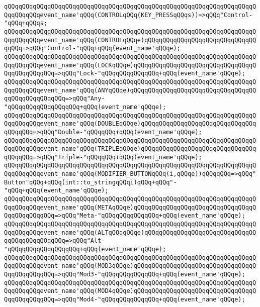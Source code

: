 \verb|qQQqqQQqqQQqqQQqqQQqqQQqqQQqqQQqqQQqqQQqqQQqqQQqqQQqqQQqqQQqqQQqqQQqqQQqqQQqqQQqevent_name'qQQq(CONTROLqQQq(KEY_PRESSqQQqs))=>qQQq"Control-"qQQq+qQQqs;|\newline
\verb|qQQqqQQqqQQqqQQqqQQqqQQqqQQqqQQqqQQqqQQqqQQqqQQqqQQqqQQqqQQqqQQqqQQqqQQqqQQqqQQqevent_name'qQQq(CONTROLqQQqe)qQQqqQQqqQQqqQQqqQQqqQQqqQQqqQQqqQQq=>qQQq"Control-"qQQq+qQQq(event_name'qQQqe);|\newline
\verb|qQQqqQQqqQQqqQQqqQQqqQQqqQQqqQQqqQQqqQQqqQQqqQQqqQQqqQQqqQQqqQQqqQQqqQQqqQQqqQQqevent_name'qQQq(LOCKqQQqe)qQQqqQQqqQQqqQQqqQQqqQQqqQQqqQQqqQQqqQQqqQQqqQQq=>qQQq"Lock-"qQQqqQQqqQQqqQQq+qQQq(event_name'qQQqe);|\newline
\verb|qQQqqQQqqQQqqQQqqQQqqQQqqQQqqQQqqQQqqQQqqQQqqQQqqQQqqQQqqQQqqQQqqQQqqQQqqQQqqQQqevent_name'qQQq(ANYqQQqe)qQQqqQQqqQQqqQQqqQQqqQQqqQQqqQQqqQQqqQQqqQQqqQQqqQQq=>qQQq"Any-"qQQqqQQqqQQqqQQqqQQq+qQQq(event_name'qQQqe);|\newline
\verb|qQQqqQQqqQQqqQQqqQQqqQQqqQQqqQQqqQQqqQQqqQQqqQQqqQQqqQQqqQQqqQQqqQQqqQQqqQQqqQQqevent_name'qQQq(DOUBLEqQQqe)qQQqqQQqqQQqqQQqqQQqqQQqqQQqqQQqqQQqqQQq=>qQQq"Double-"qQQqqQQq+qQQq(event_name'qQQqe);|\newline
\verb|qQQqqQQqqQQqqQQqqQQqqQQqqQQqqQQqqQQqqQQqqQQqqQQqqQQqqQQqqQQqqQQqqQQqqQQqqQQqqQQqevent_name'qQQq(TRIPLEqQQqe)qQQqqQQqqQQqqQQqqQQqqQQqqQQqqQQqqQQqqQQq=>qQQq"Triple-"qQQqqQQq+qQQq(event_name'qQQqe);|\newline
\verb|qQQqqQQqqQQqqQQqqQQqqQQqqQQqqQQqqQQqqQQqqQQqqQQqqQQqqQQqqQQqqQQqqQQqqQQqqQQqqQQqevent_name'qQQq(MODIFIER_BUTTONqQQq(i,qQQqe))qQQqqQQq=>qQQq"Button"qQQq+qQQq(int::to_stringqQQqi)qQQq+qQQq"-"qQQq+qQQq(event_name'qQQqe);|\newline
\verb|qQQqqQQqqQQqqQQqqQQqqQQqqQQqqQQqqQQqqQQqqQQqqQQqqQQqqQQqqQQqqQQqqQQqqQQqqQQqqQQqevent_name'qQQq(METAqQQqe)qQQqqQQqqQQqqQQqqQQqqQQqqQQqqQQqqQQqqQQqqQQqqQQq=>qQQq"Meta-"qQQqqQQqqQQqqQQq+qQQq(event_name'qQQqe);|\newline
\verb|qQQqqQQqqQQqqQQqqQQqqQQqqQQqqQQqqQQqqQQqqQQqqQQqqQQqqQQqqQQqqQQqqQQqqQQqqQQqqQQqevent_name'qQQq(ALTqQQqqQQqe)qQQqqQQqqQQqqQQqqQQqqQQqqQQqqQQqqQQqqQQqqQQqqQQq=>qQQq"Alt-"qQQqqQQqqQQqqQQqqQQq+qQQq(event_name'qQQqe);|\newline
\verb|qQQqqQQqqQQqqQQqqQQqqQQqqQQqqQQqqQQqqQQqqQQqqQQqqQQqqQQqqQQqqQQqqQQqqQQqqQQqqQQqevent_name'qQQq(MOD3qQQqe)qQQqqQQqqQQqqQQqqQQqqQQqqQQqqQQqqQQqqQQqqQQqqQQq=>qQQq"Mod3-"qQQqqQQqqQQqqQQq+qQQq(event_name'qQQqe);|\newline
\verb|qQQqqQQqqQQqqQQqqQQqqQQqqQQqqQQqqQQqqQQqqQQqqQQqqQQqqQQqqQQqqQQqqQQqqQQqqQQqqQQqevent_name'qQQq(MOD4qQQqe)qQQqqQQqqQQqqQQqqQQqqQQqqQQqqQQqqQQqqQQqqQQqqQQq=>qQQq"Mod4-"qQQqqQQqqQQqqQQq+qQQq(event_name'qQQqe);|\newline
